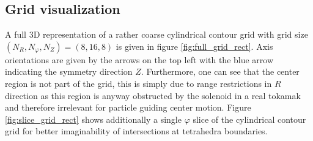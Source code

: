 \documentclass[./main.tex]{subfiles}
\begin{document}
\subsection{Grid visualization}
A full 3D representation of a rather coarse cylindrical contour grid with grid size $(N_R,N_\varphi,N_Z) = (8,16,8)$ is given in figure \ref{fig:full_grid_rect}. Axis orientations are given by the arrows on the top left with the blue arrow indicating the symmetry direction $Z$. Furthermore, one can see that the center region is not part of the grid, this is simply due to range restrictions in $R$ direction as this region is anyway obstructed by the solenoid in a real tokamak and therefore irrelevant for particle guiding center motion. Figure \ref{fig:slice_grid_rect} shows additionally a single $\varphi$ slice of the cylindrical contour grid for better imaginability of intersections at tetrahedra boundaries.
\end{document}
